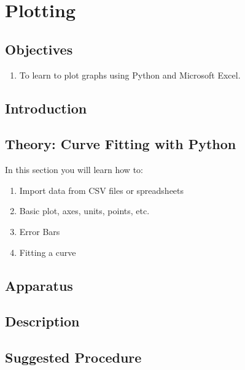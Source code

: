 
\chapter{Plotting}
\section{Objectives}

\begin{enumerate}
    \item To learn to plot graphs using Python and Microsoft Excel.
\end{enumerate}

\section{Introduction}


\section{Theory: Curve Fitting with Python}

In this section you will learn how to:

\begin{enumerate}
    \item Import data from CSV files or spreadsheets
    \item Basic plot, axes, units, points, etc.
    \item Error Bars
    \item Fitting a curve
\end{enumerate}


\section{Apparatus}



\section{Description}



\section{Suggested Procedure}



\newpage